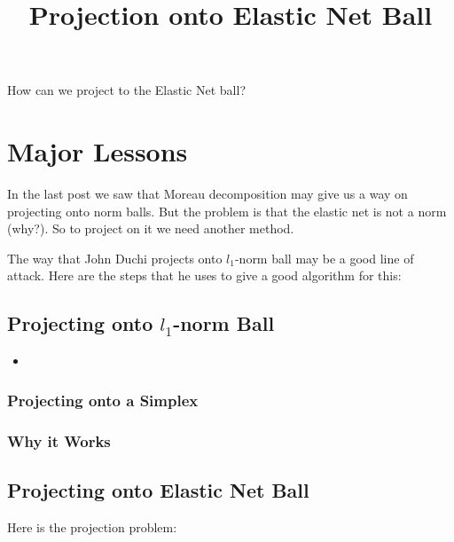 \documentclass[]{article}
\title{Projection onto Elastic Net Ball}
\begin{document}
	
How can we project to the Elastic Net ball? 

\section{Major Lessons}
In the last post we saw that Moreau decomposition may give us a way on projecting onto norm balls. But the problem is that the elastic net is not a norm (why?). So to project on it we need another method. 

The way that John Duchi projects onto $l_1$-norm ball may be a good line of attack. Here are the steps that he uses to give a good algorithm for this:

\subsection{Projecting onto $l_1$-norm Ball}
\begin{itemize}
	\item 
\end{itemize}


\subsubsection{Projecting onto a Simplex}

\subsubsection{Why it Works}

\subsection{Projecting onto Elastic Net Ball}
Here is the projection problem:
\end{document}
